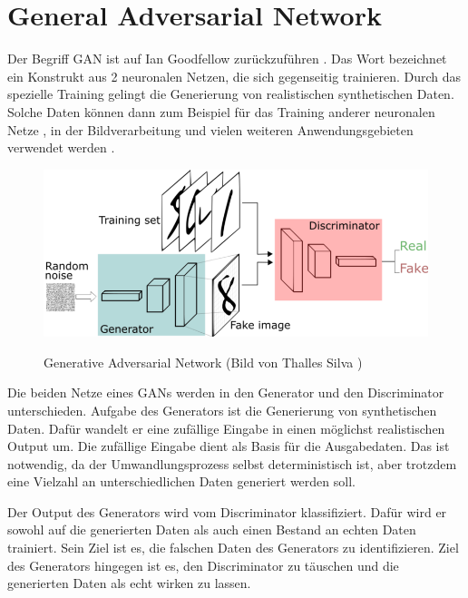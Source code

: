 \section{General Adversarial Network}
Der Begriff \acrfull{GAN} ist auf Ian Goodfellow zurückzuführen \cite{gan-original-paper}.
Das Wort bezeichnet ein Konstrukt aus 2 neuronalen Netzen, die sich gegenseitig trainieren.
Durch das spezielle Training gelingt die Generierung von realistischen synthetischen Daten.
Solche Daten können dann zum Beispiel für das Training anderer neuronalen Netze \cite{gan-application-augmenting-training-data}, in der Bildverarbeitung \cite{gan-application-upscaling, gan-application-blending} und vielen weiteren Anwendungsgebieten verwendet werden \cite{gan-application-dna-optimizes-protein-functions, gan-application-audio-synthesis}.

\begin{figure}[H]
	\centering
	\includegraphics[width=12cm]{kapitel/2_stand_der_technik/img/GAN.png}
	\label{img:gan}
	\caption{Generative Adversarial Network (Bild von Thalles Silva \cite{img-gan})}
\end{figure}

Die beiden Netze eines \acrshort{GAN}s werden in den Generator und den Discriminator unterschieden.
Aufgabe des Generators ist die Generierung von synthetischen Daten.
Dafür wandelt er eine zufällige Eingabe in einen möglichst realistischen Output um.
Die zufällige Eingabe dient als Basis für die Ausgabedaten.
Das ist notwendig, da der Umwandlungsprozess selbst deterministisch ist, aber trotzdem eine Vielzahl an unterschiedlichen Daten generiert werden soll.
\newline

Der Output des Generators wird vom Discriminator klassifiziert.
Dafür wird er sowohl auf die generierten Daten als auch einen Bestand an echten Daten trainiert.
Sein Ziel ist es, die falschen Daten des Generators zu identifizieren.
Ziel des Generators hingegen ist es, den Discriminator zu täuschen und die generierten Daten als echt wirken zu lassen.
\newline

